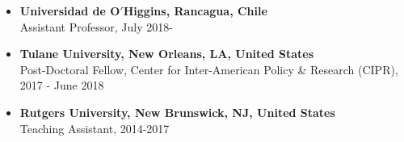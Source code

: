 \begin{itemize}
  \item[] {\bf Universidad de O$'$Higgins, Rancagua, Chile}\\
  Assistant Professor, July 2018-

  \item[] {\bf Tulane University, New Orleans, LA, United States}\\
  Post-Doctoral Fellow, Center for Inter-American Policy \& Research (CIPR), 2017 - June 2018

  \item[] {\bf Rutgers University, New Brunswick, NJ, United States}\\
  Teaching Assistant, 2014-2017
\end{itemize}
